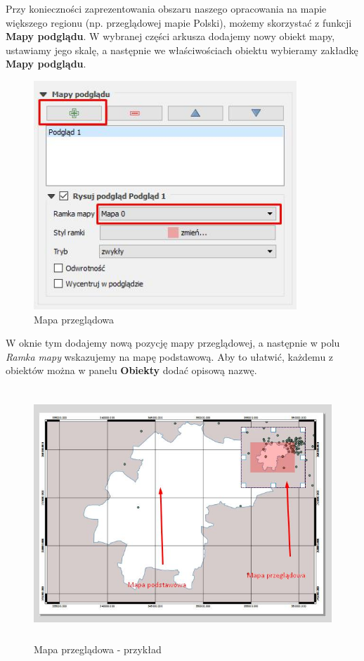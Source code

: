 \documentclass[12pt,a4paper]{book}
\begin{document}
Przy konieczności zaprezentowania obszaru naszego opracowania na mapie większego regionu (np. przeglądowej mapie Polski), możemy skorzystać z funkcji \textbf{Mapy podglądu}. W wybranej części arkusza dodajemy nowy obiekt mapy, ustawiamy jego skalę, a następnie we właściwościach obiektu wybieramy zakładkę \textbf{Mapy podglądu}.



\begin{center}
\begin{figure}
\includegraphics[width=9.899cm,height=8.601cm]{008-przegladowa.jpg}
\caption{Mapa przeglądowa}
\end{figure}
\end{center}
W oknie tym dodajemy nową pozycję mapy przeglądowej, a następnie w polu \textit{Ramka} \textit{mapy }wskazujemy na mapę podstawową. Aby to ułatwić, każdemu z obiektów można w panelu\textit{ }\textbf{Obiekty }dodać opisową nazwę.



\begin{center}
\begin{figure}
\includegraphics[width=13cm,height=9.472cm]{008-przegladowa-przyklad.jpg}
\caption{Mapa przeglądowa - przykład}
\end{figure}
\end{center}
\end{document}
